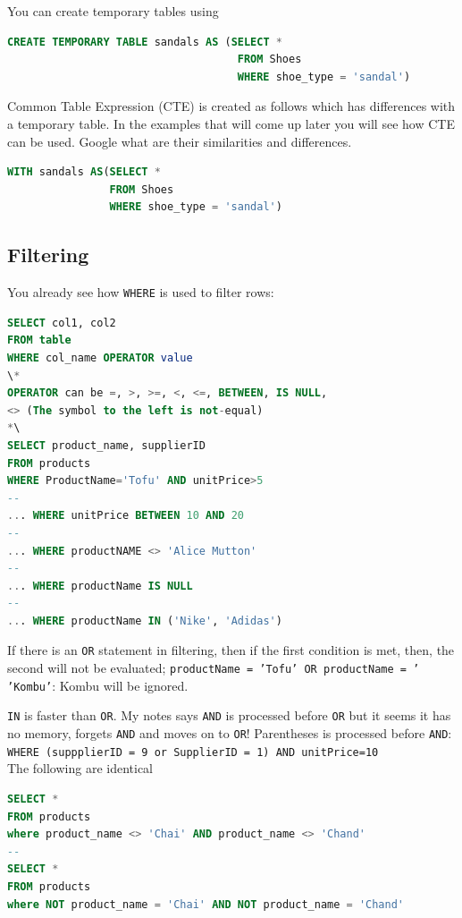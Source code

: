 You can create temporary tables using 
\begin{lstlisting}[language=SQL]
CREATE TEMPORARY TABLE sandals AS (SELECT * 
                                    FROM Shoes
                                    WHERE shoe_type = 'sandal')
\end{lstlisting}

Common Table Expression (CTE) is created as follows which has
differences with a temporary table. In the examples that will come up later
you will see how CTE can be used. Google what are their similarities and
differences.
\begin{lstlisting}[language=SQL]
WITH sandals AS(SELECT * 
                FROM Shoes
                WHERE shoe_type = 'sandal')
\end{lstlisting}


\subsection{Filtering}
You already see how \texttt{WHERE} is 
used to filter rows:
\begin{lstlisting}[language=SQL]
SELECT col1, col2
FROM table
WHERE col_name OPERATOR value
\*
OPERATOR can be =, >, >=, <, <=, BETWEEN, IS NULL,
<> (The symbol to the left is not-equal)
*\
SELECT product_name, supplierID
FROM products
WHERE ProductName='Tofu' AND unitPrice>5
--
... WHERE unitPrice BETWEEN 10 AND 20
--
... WHERE productNAME <> 'Alice Mutton'
--
... WHERE productName IS NULL
--
... WHERE productName IN ('Nike', 'Adidas')
\end{lstlisting}

  If there is an \texttt{OR} statement in filtering, 
then if the first condition is met, then, the second will not be evaluated;
\texttt{productName = 'Tofu' OR productName = ' 'Kombu'}: Kombu will be ignored. 

\texttt{IN} is faster than \texttt{OR}.
My notes says \texttt{AND} is processed before \texttt{OR} but it seems it has
no memory, forgets \texttt{AND} and moves on to \texttt{OR}!
Parentheses is processed before \texttt{AND}:
\texttt{WHERE (suppplierID = 9 or SupplierID = 1) AND unitPrice=10} \\

\noindent The following are identical
\begin{lstlisting}[language=SQL]
SELECT * 
FROM products
where product_name <> 'Chai' AND product_name <> 'Chand'
--
SELECT * 
FROM products
where NOT product_name = 'Chai' AND NOT product_name = 'Chand'
\end{lstlisting}

